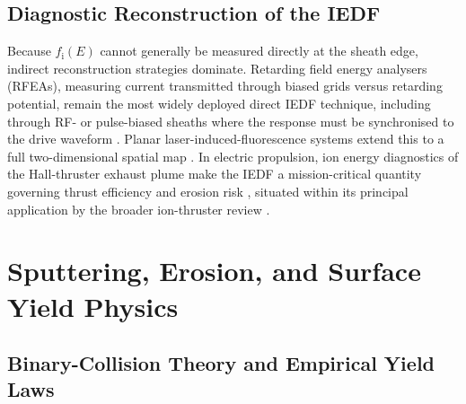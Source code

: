 \subsection{Diagnostic Reconstruction of the IEDF}

Because $f_{\mathrm{i}}(E)$ cannot generally be measured directly at the sheath edge, indirect reconstruction strategies dominate. Retarding field energy analysers (RFEAs), measuring current transmitted through biased grids versus retarding potential, remain the most widely deployed direct IEDF technique, including through RF- or pulse-biased sheaths where the response must be synchronised to the drive waveform \cite{ref0540}. Planar laser-induced-fluorescence systems extend this to a full two-dimensional spatial map \cite{ref0304}. In electric propulsion, ion energy diagnostics of the Hall-thruster exhaust plume make the IEDF a mission-critical quantity governing thrust efficiency and erosion risk \cite{ref0114}, situated within its principal application by the broader ion-thruster review \cite{ref0115}.

\section{Sputtering, Erosion, and Surface Yield Physics}

\subsection{Binary-Collision Theory and Empirical Yield Laws}


